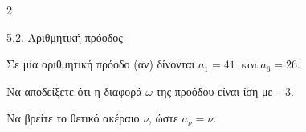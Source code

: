 \begin{ylh}{2}
    \item 5.2. Αριθμητική πρόοδος
\end{ylh}
Σε μία αριθμητική πρόοδο (αν) δίνονται $a_{1} = 41\ \text{ και}\ a_{6} = 26$.

\begin{alist}
\item Να αποδείξετε ότι η διαφορά $\omega$ της προόδου είναι ίση με $-3$.

\item Να βρείτε το θετικό ακέραιο $\nu$, ώστε $a_{\nu} = \nu$.
\end{alist}


